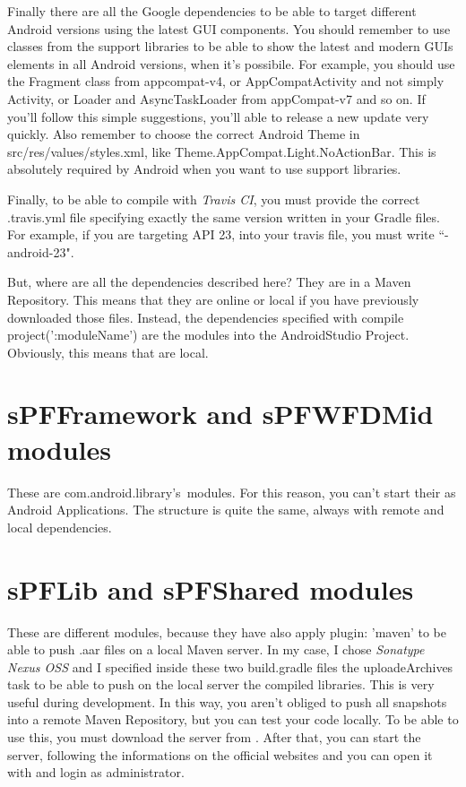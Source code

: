 Finally there are all the Google dependencies to be able to target different Android versions using the latest GUI components. You should remember to use classes from the support libraries to be able to show the latest and modern GUIs elements in all Android versions, when it's possibile. For example, you should use the \textsf{Fragment} class from \textsf{appcompat-v4}, or \textsf{AppCompatActivity} and not simply \textsf{Activity}, or \textsf{Loader} and \textsf{AsyncTaskLoader} from \textsf{appCompat-v7} and so on. If you'll follow this simple suggestions, you'll able to release a new update very quickly.
Also remember to choose the correct Android Theme in \textsf{src/res/values/styles.xml}, like \textsf{Theme.AppCompat.Light.NoActionBar}. This is absolutely required by Android when you want to use support libraries.

Finally, to be able to compile with \emph{Travis CI}, you must provide the correct \textsf{.travis.yml} file specifying exactly the same version written in your Gradle files. For example, if you are targeting API 23, into your travis file, you must write ``- android-23".

But, where are all the dependencies described here? They are in a Maven Repository. This means that they are online or local if you have previously downloaded those files. Instead, the dependencies specified with \textsf{compile project(':moduleName')} are the modules into the AndroidStudio Project. Obviously, this means that are local.

\section*{sPFFramework and sPFWFDMid modules}
These are \textsf{com.android.library}'s modules. For this reason, you can't start their as Android Applications. The structure is quite the same, always with remote and local dependencies.

\section*{sPFLib and sPFShared modules}
These are different modules, because they have also \textsf{apply plugin: 'maven'} to be able to push \textsf{.aar} files on a local Maven server.
In my case, I chose \emph{Sonatype Nexus OSS} and I specified inside these two \textsf{build.gradle} files the \textsf{uploadeArchives} task to be able to push on the local server the compiled libraries. This is very useful during development. In this way, you aren't obliged to push all snapshots into a remote Maven Repository, but you can test your code locally. To be able to use this, you must download the server from . 
After that, you can start the server, following the informations on the official websites and you can open it with  and login as administrator.

